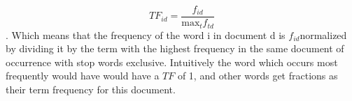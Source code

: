 $$TF_{id}=\frac{f_{id}}{\text{max}_tf_{td}}$$.
Which means that the  frequency of the word  i in document d is $f_{id }$normalized by dividing
it by the term with the highest frequency in the same document of occurrence with stop words exclusive.
Intuitively the word which occurs most frequently would have  would have a $TF$ of 1,
and other words get fractions as their term frequency for this document.
%
%
%
%
%
%
%
%
%
%
%
%

